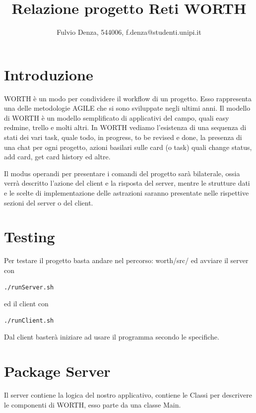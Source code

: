 \documentclass[]{article}
\title{Relazione progetto Reti WORTH}
\author{Fulvio Denza, 544006, f.denza@studenti.unipi.it}
\begin{document}
\maketitle

\section{Introduzione}
WORTH è un modo per condividere il workflow di un progetto. Esso rappresenta una delle metodologie AGILE che si sono sviluppate negli ultimi anni. Il modello di WORTH è un modello semplificato di applicativi del campo, quali easy redmine, trello e molti altri. In WORTH vediamo l'esistenza di una sequenza di stati dei vari task, quale todo, in progress, to be revised e done, la presenza di una chat per ogni progetto, azioni basilari sulle card (o task) quali change status, add card, get card history ed altre.

Il modus operandi per presentare i comandi del progetto sarà bilaterale, ossia verrà descritto l'azione del client e la risposta del server, mentre le strutture dati e le scelte di implementazione delle astrazioni saranno presentate nelle rispettive sezioni del server o del client.
\section{Testing}
Per testare il progetto basta andare nel percorso:
worth/src/ ed avviare il server con
\begin{lstlisting}[language=bash]
	./runServer.sh
\end{lstlisting}
ed il client con
\begin{lstlisting}[language=bash]
	./runClient.sh
\end{lstlisting}
Dal client basterà iniziare ad usare il programma secondo le specifiche.
\section{Package Server}
Il server contiene la logica del nostro applicativo, contiene le Classi per descrivere le componenti di WORTH, esso parte da una classe Main.
\end{document}

